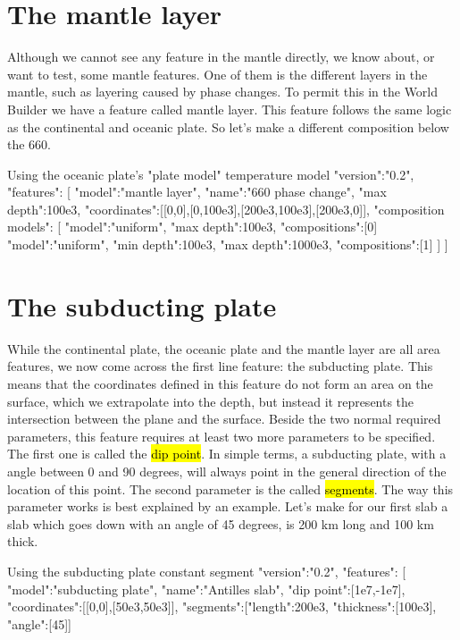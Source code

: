 \documentclass{book}
\newcommand{\WB}{{World Builder}}
\begin{document}
\section{The mantle layer}
Although we cannot see any feature in the mantle directly, we know about, or want to test, some mantle features. One of them is the different layers in the mantle, such as layering caused by phase changes. To permit this in the \WB{} we have a feature called mantle layer. This feature follows the same logic as the continental and oceanic plate. So let's make a different composition below the 660.

\begin{javascriptcode}{Using the oceanic plate's "plate model" temperature model}{}
{
  "version":"0.2",
  "features":
  [
    {
      "model":"mantle layer", "name":"660 phase change", "max depth":100e3,
      "coordinates":[[0,0],[0,100e3],[200e3,100e3],[200e3,0]],
      "composition models":
      [
        {"model":"uniform", "max depth":100e3, "compositions":[0]}
        {"model":"uniform", "min depth":100e3, "max depth":1000e3, "compositions":[1]}
      ]
    }
  ]
}
\end{javascriptcode}

\section{The subducting plate}
While the continental plate, the oceanic plate and the mantle layer are all area features, we now come across the first line feature: the subducting plate. This means that the coordinates defined in this feature do not form an area on the surface, which we extrapolate into the depth, but instead it represents the intersection between the plane and the surface. Beside the two normal required parameters, this feature requires at least two more parameters to be specified. The first one is called the \hl{dip point}. In simple terms, a subducting plate, with a angle between 0 and 90 degrees, will always point in the general direction of the location of this point. The second parameter is the called \hl{segments}. The way this parameter works is best explained by an example. Let's make for our first slab a slab which goes down with an angle of 45 degrees, is 200 km long and 100 km thick.

\begin{javascriptcode}{Using the subducting plate constant segment}{}
{
"version":"0.2",
"features":
[
     {
       "model":"subducting plate", "name":"Antilles slab", "dip point":[1e7,-1e7],
       "coordinates":[[0,0],[50e3,50e3]], 
       "segments":[{"length":200e3, "thickness":[100e3], "angle":[45]}]
    }
}
\end{javascriptcode}
\end{document}
